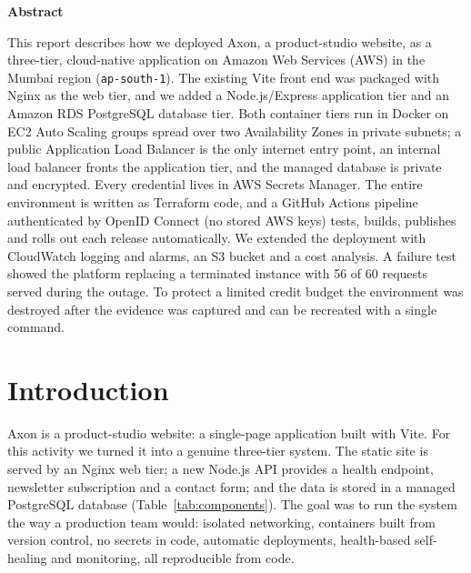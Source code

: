 \documentclass[10pt,a4paper]{article}
\begin{document}
\begin{center}{\color{maroon}\bfseries\large Abstract}\end{center}
\noindent This report describes how we deployed Axon, a product-studio website, as a three-tier, cloud-native application
on Amazon Web Services (AWS) in the Mumbai region (\texttt{ap-south-1}). The existing Vite front end was packaged with
Nginx as the web tier, and we added a Node.js/Express application tier and an Amazon RDS PostgreSQL database tier.
Both container tiers run in Docker on EC2 Auto Scaling groups spread over two Availability Zones in private subnets; a public
Application Load Balancer is the only internet entry point, an internal load balancer fronts the application tier, and the
managed database is private and encrypted. Every credential lives in AWS Secrets Manager. The entire environment is written as
Terraform code, and a GitHub Actions pipeline authenticated by OpenID Connect (no stored AWS keys) tests, builds, publishes and
rolls out each release automatically. We extended the deployment with CloudWatch logging and alarms, an S3 bucket and a cost
analysis. A failure test showed the platform replacing a terminated instance with 56 of 60 requests served during the
outage. To protect a limited credit budget the environment was destroyed after the evidence was captured and can be recreated
with a single command.

\vspace{0.4cm}
{\small\tableofcontents}
\clearpage


\section{Introduction}
Axon is a product-studio website: a single-page application built with Vite. For this activity we turned it into a
genuine three-tier system. The static site is served by an Nginx web tier; a new Node.js API provides a health endpoint,
newsletter subscription and a contact form; and the data is stored in a managed PostgreSQL database (Table~\ref{tab:components}).
The goal was to run the system the way a production team would: isolated networking, containers built from version control,
no secrets in code, automatic deployments, health-based self-healing and monitoring, all reproducible from code.
\end{document}

